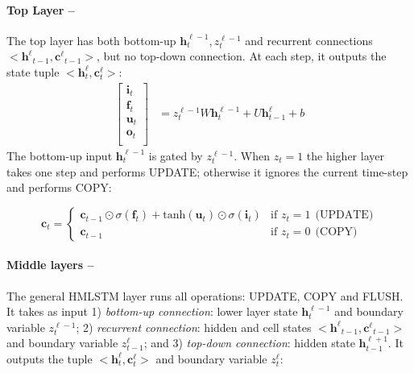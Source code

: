 \paragraph{Top Layer --}
The top layer has both bottom-up $\mathbf{h}^{\ell-1}_t, z^{\ell-1}_t$ and recurrent connections $<\mathbf{h^\ell}_{t-1}, \mathbf{c^\ell}_{t-1}>$, but no top-down connection. At each step, it outputs the state tuple $<\mathbf{h}^{\ell}_{t}, \mathbf{c}^{\ell}_{t}>$:  
\begin{align}
     \begin{bmatrix}
           \mathbf{i}_{t} \\
           \mathbf{f}_{t} \\
           \mathbf{u}_{t} \\
           \mathbf{o}_t \\
         \end{bmatrix} &= z^{\ell-1}_t W \mathbf{h}^{\ell-1}_t + U\mathbf{h}^\ell_{t-1}  + b 
\end{align}
The bottom-up input $\mathbf{h}^{\ell-1}_t$ is gated by $z^{\ell-1}_t$. 
When $z_t=1$ the higher layer takes one step and performs UPDATE; otherwise it ignores the current time-step and performs COPY:

\begin{equation}
    \mathbf{c}_t = \begin{cases}  
            \mathbf{c}_{t-1} \odot \sigma (\mathbf{f}_t) + \text{tanh}(\mathbf{u}_t) \odot \sigma (\mathbf{i}_t) &
            \mbox{if } z_t = 1  \: \: \text{(UPDATE)}\\
            \mathbf{c}_{t-1} &  \mbox{if } z_t = 0  \: \: \text{(COPY)}
            \end{cases}
\end{equation}

\paragraph{Middle layers --}

The general HMLSTM layer runs all operations: UPDATE, COPY and FLUSH. It takes as input 1) \emph{bottom-up connection}: lower layer state $\mathbf{h}^{\ell-1}_t$ and boundary variable $z^{\ell-1}_t$; 2) \emph{recurrent connection}: hidden and cell states $<\mathbf{h^\ell}_{t-1}, \mathbf{c^\ell}_{t-1}>$  and boundary variable $z^\ell_{t-1}$; and 3) \emph{top-down connection}: hidden state $\mathbf{h}^{\ell+1}_{t-1}$. It outputs the tuple $<\mathbf{h}^\ell_{t}, \mathbf{c}^\ell_{t}>$ and boundary variable $z^\ell_t$:

